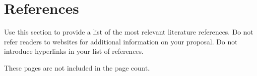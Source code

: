 \documentclass[english,
]{nserc-alliance}
\begin{document}
\newpage
\begingroup
\section*{References}
\renewcommand{\section}[2]{}%
\ifinst\begin{instructions}
  \item Use this section to provide a list of the most relevant literature references. Do not refer readers to websites for additional information on your proposal. Do not introduce hyperlinks in your list of references.
  \item These pages are not included in the page count.
\end{instructions}\fi


\endgroup
\end{document}
